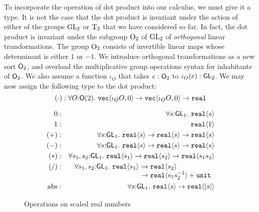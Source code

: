 To incorporate the operation of dot product into our calculus, we must
give it a type. It is not the case that the dot product is invariant
under the action of either of the groups $\mathrm{GL}_2$ or $\mathrm{T}_2$ that
we have considered so far. In fact, the dot product is invariant under
the subgroup $\mathrm{O}_2$ of $\mathrm{GL}_2$ of \emph{orthogonal} linear
transformations. The group $\mathrm{O}_2$ consists of invertible linear
maps whose determinant is either $1$ or $-1$. We introduce orthogonal
transformations as a new sort $\mathsf{O}_2$, and overload the
multiplicative group operations syntax for inhabitants of
$\mathsf{O}_2$. We also assume a function $\iota_O$ that takes $e :
\mathsf{O}_2$ to $\iota_O(e) : \mathsf{GL}_2$. We may now assign the following type
to the dot product:
\begin{displaymath}
  (\cdot) : \forall O \mathord: \mathsf{O}(2).\ \texttt{vec}\langle \iota_OO, 0 \rangle \to \texttt{vec}\langle \iota_OO, 0 \rangle \to \texttt{real}
\end{displaymath}

\begin{figure}[t]
  \centering
  \begin{eqnarray*}
    0   &:& \forall s \mathord:\SynGL_1.\ \tyPrim{real}{s} \\
    1   &:& \tyPrim{real}{1} \\
    (+) &:& \forall s \mathord:\SynGL_1.\ \tyPrim{real}{s} \to \tyPrim{real}{s} \to \tyPrim{real}{s} \\
    (-) &:& \forall s \mathord:\SynGL_1.\ \tyPrim{real}{s} \to \tyPrim{real}{s} \to \tyPrim{real}{s} \\
    (*) &:& \forall s_1,s_2 \mathord:\SynGL_1.\ \tyPrim{real}{s_1} \to \tyPrim{real}{s_2} \to \tyPrim{real}{s_1s_2} \\
    (/) &:&
    \begin{array}[t]{@{}l@{}l}
      \forall s_1,s_2 \mathord:\SynGL_1.\ \tyPrim{real}{s_1}\ & \to \tyPrim{real}{s_2} \\
      &\to \tyPrim{real}{s_1s_2^{-1}} + \tyPrimNm{unit} \\
    \end{array}\\
    \mathrm{abs} &:& \forall s \mathord:\SynGL_1.\ \tyPrim{real}{s} \to \tyPrim{real}{|s|} %
  \end{eqnarray*}
  \caption{Operations on scaled real numbers}
  \label{fig:real-ops}
\end{figure}

